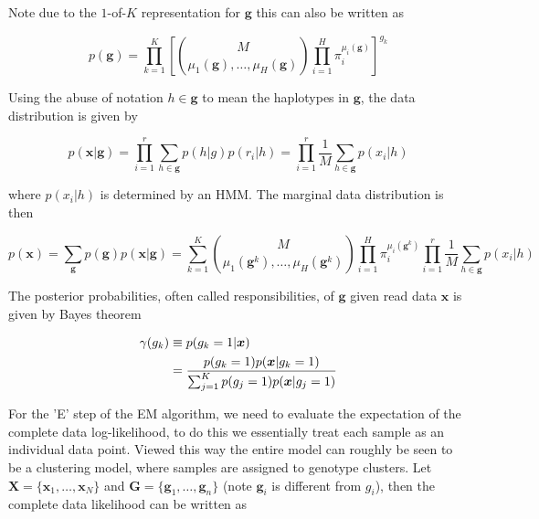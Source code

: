 \documentclass{article}
\begin{document}
Note due to the $1$-of-$K$ representation for $\boldsymbol{g}$ this can also be written as

\begin{equation} 
    p(\boldsymbol{g}) = \prod_{k = 1}^K \left[\binom{M}{\mu_1(\boldsymbol{g}),\dots,\mu_H(\boldsymbol{g})} \prod_{i = 1}^H \pi_i^{\mu_i(\boldsymbol{g})}\right]^{g_k}
\end{equation}

Using the abuse of notation $h \in \boldsymbol{g}$ to mean the haplotypes in $\boldsymbol{g}$, the data distribution is given by

\begin{equation} 
    p(\boldsymbol{x} | \boldsymbol{g}) = \prod_{i = 1}^{r} \sum_{h \in \boldsymbol{g}} p(h | g) p(r_i | h)  = \prod_{i = 1}^{r} \frac{1}{M} \sum_{h \in \boldsymbol{g}} p(x_i | h)
\end{equation}

where $p(x_i | h)$ is determined by an HMM. The marginal data distribution is then

\begin{equation} 
    p(\boldsymbol{x}) = \sum_{\boldsymbol{g}} p(\boldsymbol{g}) p(\boldsymbol{x} | \boldsymbol{g}) = \sum_{k = 1}^{K}  \binom{M}{\mu_1(\boldsymbol{g}^k),\dots,\mu_H(\boldsymbol{g}^k)} \prod_{i = 1}^H \pi_i^{\mu_i(\boldsymbol{g}^k)} \prod_{i = 1}^{r} \frac{1}{M} \sum_{h \in \boldsymbol{g}} p(x_i | h)
\end{equation}

The posterior probabilities, often called responsibilities, of $\boldsymbol{g}$ given read data $\boldsymbol{x}$ is given by Bayes theorem

\begin{align} 
    \gamma(g_k) &\equiv p(g_k = 1 | \boldsymbol{x}) \notag\\
    &= \frac{p(g_k = 1) p(\boldsymbol{x} | g_k = 1)}{\sum_{j = 1}^{K} p(g_j = 1) p(\boldsymbol{x} | g_j = 1)}
\end{align}

For the 'E' step of the EM algorithm, we need to evaluate the expectation of the complete data log-likelihood, to do this we essentially treat each sample as an individual data point. Viewed this way the entire model can roughly be seen to be a clustering model, where samples are assigned to genotype clusters. Let $\boldsymbol{X} = \{\boldsymbol{x}_1, \dots, \boldsymbol{x}_N\}$ and $\boldsymbol{G} = \{\boldsymbol{g}_1, \dots, \boldsymbol{g}_n\}$ (note $\boldsymbol{g}_i$ is different from $g_i$), then the complete data likelihood can be written as
\end{document}
